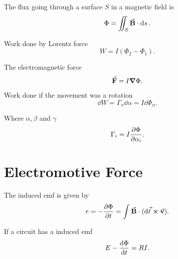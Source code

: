 The flux going through a surface $S$ in a magnetic field is
\[
	\Phi = \iint_S \va{B}\cdot\dd{s}
	.\]

Work done by Lorentz force
\[
	W = I(\Phi_2 - \Phi_1)
	.\]

The electromagnetic force
\[
	\va{F} = I \grad{\Phi}
	.\]

Work done if the movement was a rotation
\[
	\dd{W} = \Gamma_x\dd{\alpha} = I \dd{\Phi_\alpha}
	.\]

Where $\alpha, \beta$ and $\gamma$
\[
	\Gamma_i = I \pdv{\Phi}{\alpha_i}
	.\]

\section{Electromotive Force}
The induced emf is given by
\[
	e = -\pdv{\Phi}{t} = \int \va{B}\cdot(\dd{\va{\ell}}\cross\va{v})
	.\]

If a circuit has a induced emf
\[
	E-\dv{\Phi}{t} = RI
	.\]


